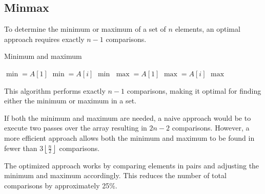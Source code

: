 \subsection{Minmax}
To determine the minimum or maximum of a set of $n$ elements, an optimal approach requires exactly $n-1$ comparisons. 
\begin{algorithm}[H]
    \caption{Minimum and maximum}
    \begin{algorithmic}[1]
        \State $\min=A[1]$ 
                \State $\min=A[i]$
            \EndIf
        \EndFor
        \State \Return $\min$
        \EndFunction
        \Statex 
        \State $\max=A[1]$ 
                \State $\max=A[i]$
            \EndIf
        \EndFor
        \State \Return $\max$
        \EndFunction
    \end{algorithmic}
\end{algorithm}  
This algorithm performs exactly $n-1$ comparisons, making it optimal for finding either the minimum or maximum in a set.

If both the minimum and maximum are needed, a naive approach would be to execute two passes over the array resulting in $2n-2$ comparisons.
However, a more efficient approach allows both the minimum and maximum to be found in fewer than $3\left\lfloor \frac{n}{2} \right\rfloor$ comparisons.

The optimized approach works by comparing elements in pairs and adjusting the minimum and maximum accordingly. 
This reduces the number of total comparisons by approximately 25\%.

